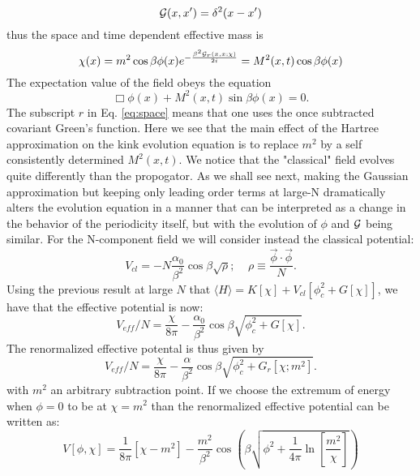 \documentclass[a4paper,prd,preprint,superscriptaddress,showpacs,byrevtex]{revtex4}
\begin{document}
\begin{equation}
[\Box + M^2(x,t) \cos \beta \phi(x)] {\cal G}(x,x') = \delta^2 (x-x')
\end{equation} thus the space and time dependent effective mass is
\begin{equation}
\chi(x) = m^2 \cos \beta \phi(x) e^{-\frac{\beta^2 {\cal G}_r(x,x;\chi)}{2i}} = M^2
(x,t) \cos \beta \phi(x) \label{eq:space}\end{equation}
The expectation value of the field obeys the equation
\begin{equation}
\Box \phi(x)  + M^2(x,t) \sin \beta \phi(x)       =0.
\end{equation}
The subscript $r$ in Eq. \ref{eq:space} means that one uses the once
subtracted covariant Green's function. Here we see that the main effect of the Hartree approximation on the
kink evolution equation is to replace $m^2$ by a self consistently determined
$M^2(x,t)$. We notice that the "classical" field evolves quite differently
than the propogator.  As we shall
see next, making the Gaussian approximation but keeping
only leading order terms at large-N dramatically alters the evolution
equation
in a manner that can be interpreted as a change in the behavior of the
periodicity itself, but with the
evolution of $\phi$ and ${\cal G}$ being similar. 
For the N-component field we will consider instead the classical potential:
\begin{equation}
V_{cl} = -N \frac {\alpha_0} {\beta^2} \cos \beta \sqrt{\rho};  ~~~~~\rho
\equiv \frac{\vec \phi \cdot \vec \phi} {N}.
\end{equation}
Using the previous result at large $N$ that $ \langle H \rangle = K[\chi] +
V_{cl}\left[ \phi_c^2 + G[\chi]\right]$,
we have that the effective potential is now:
\begin{equation}
V_{eff}/N  = \frac{\chi}{8 \pi} - \frac {\alpha_0} {\beta^2} \cos \beta
\sqrt{\phi_c^2 + G[\chi]}.
\end{equation}
The renormalized effective potental is thus given by
\begin{equation}
V_{eff}/N  = \frac{\chi}{8 \pi} - \frac {\alpha} {\beta^2} \cos \beta
\sqrt{\phi_c^2 + G_r[\chi;m^2]}.
\end{equation}
with $m^2$ an arbitrary subtraction point.
If we choose the extremum of energy when $\phi=0$ to be at $\chi= m^2$ than
the
renormalized effective potential can be written as:
\begin{equation}
V[\phi,\chi] = \frac{1}{8 \pi} [\chi -m^2] -\frac{m^2}{\beta^2} \cos \left(
\beta \sqrt{\phi^2+
\frac{1}{4 \pi} \ln[\frac{m^2}{\chi}]} \right)
\end{equation}
\end{document}
